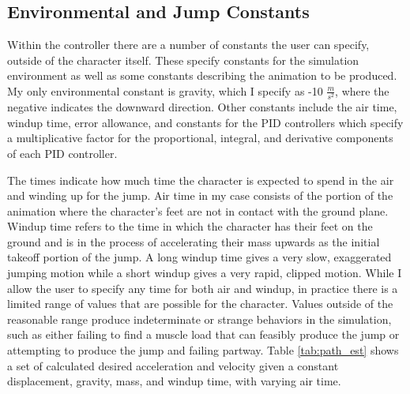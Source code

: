 \subsection{Environmental and Jump Constants}
\label{subsection:user_constants}
Within the controller there are a number of constants the user can specify, outside of the character itself.  These specify constants for the simulation environment as well as some constants describing the animation to be produced.  My only environmental constant is gravity, which I specify as -10 $\frac{m}{s^2}$, where the negative indicates the downward direction.  Other constants include the air time, windup time, error allowance, and constants for the PID controllers which specify a multiplicative factor for the proportional, integral, and derivative components of each PID controller.

The times indicate how much time the character is expected to spend in the air and winding up for the jump.  Air time in my case consists of the portion of the animation where the character's feet are not in contact with the ground plane.  Windup time refers to the time in which the character has their feet on the ground and is in the process of accelerating their mass upwards as the initial takeoff portion of the jump.  A long windup time gives a very slow, exaggerated jumping motion while a short windup gives a very rapid, clipped motion.  While I allow the user to specify any time for both air and windup, in practice there is a limited range of values that are possible for the character.  Values outside of the reasonable range produce indeterminate or strange behaviors in the simulation, such as either failing to find a muscle load that can feasibly produce the jump or attempting to produce the jump and failing partway.  Table \ref{tab:path_est} shows a set of calculated desired acceleration and velocity given a constant displacement, gravity, mass, and windup time, with varying air time.

